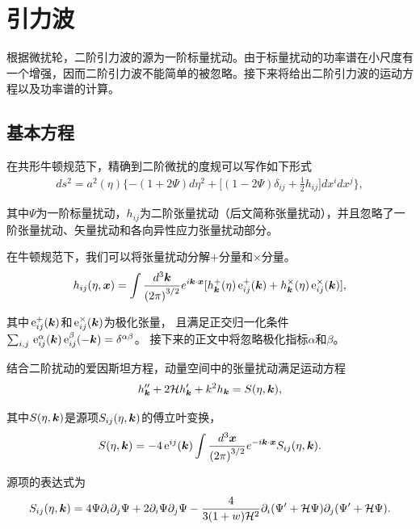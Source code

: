 \section{引力波}

根据微扰轮，二阶引力波的源为一阶标量扰动。由于标量扰动的功率谱在小尺度有一个增强，因而二阶引力波不能简单的被忽略。接下来将给出二阶引力波的运动方程以及功率谱的计算。

\subsection{基本方程}
在共形牛顿规范下，精确到二阶微扰的度规可以写作如下形式
\begin{align}
    ds^2 =
    a^2(\eta)\lbrace-(1+2\Psi)d\eta^2+\lbrack(1-2\Psi)\delta_{ij}+\frac{1}{2}h_{ij}\rbrack
    dx^i dx^j\rbrace,
\end{align}

其中$\Psi$为一阶标量扰动，$h_{ij}$为二阶张量扰动（后文简称张量扰动），并且忽略了一阶张量扰动、矢量扰动和各向异性应力张量扰动部分。

在牛顿规范下，我们可以将张量扰动分解$+$分量和$\times$分量。
\begin{align}
    h_{ij}(\eta,\boldsymbol{x})=\int \frac{d^3\boldsymbol{k}}{{(2\pi)}^{3/2}} e^{i\boldsymbol{k}\cdot\boldsymbol{x}}
    \lbrack
    h^{+}_{\boldsymbol{k}}(\eta)\,\mathrm{e}^{+}_{ij}(\boldsymbol{k}) +
    h^{\times}_{\boldsymbol{k}}(\eta)\,\mathrm{e}^{\times}_{ij}(\boldsymbol{k})
    \rbrack,
\end{align}

其中$\,\mathrm{e}^{+}_{ij}(\boldsymbol{k})$和$\,\mathrm{e}^{\times}_{ij}(\boldsymbol{k})$为极化张量，
且满足正交归一化条件$\sum_{i,j}\,\mathrm{e}^{\alpha}_{ij}(\boldsymbol{k})\,\mathrm{e}^{\beta}_{ij}(-\boldsymbol{k})=\delta^{\alpha\beta}$。
接下来的正文中将忽略极化指标$\alpha$和$\beta$。

结合二阶扰动的爱因斯坦方程，动量空间中的张量扰动满足运动方程
\begin{align}\label{eq:motion_eq_for_hij}
    h^{\prime\prime}_{\boldsymbol{k}}+2\mathcal{H}h^{\prime}_{\boldsymbol{k}}+k^2h_{\boldsymbol{k}}
    = S(\eta,\boldsymbol{k}),
\end{align}

其中$S(\eta,\boldsymbol{k})$是源项$S_{ij}(\eta,\boldsymbol{k})$的傅立叶变换，
\begin{align}
    S(\eta, \boldsymbol{k}) = -4\,\mathrm{e}^{ij}(\boldsymbol{k})\int
    \frac{d^3\boldsymbol{x}}{{(2\pi)}^{3/2}}
    e^{-i\boldsymbol{k}\cdot\boldsymbol{x}}S_{ij}(\eta,\boldsymbol{k}).
\end{align}

源项的表达式为\citep{ananda2007cosmological,baumann2007gravitational}
\begin{align}
    S_{ij}(\eta,\boldsymbol{k})=
    4\Psi\partial_i\partial_j\Psi + 2\partial_i\Psi\partial_j\Psi-
    \frac{4}{3(1+w)\mathcal{H}^2}\partial_i(\Psi^\prime+\mathcal{H}\Psi)\partial_j(\Psi^\prime+\mathcal{H}\Psi).
\end{align}

